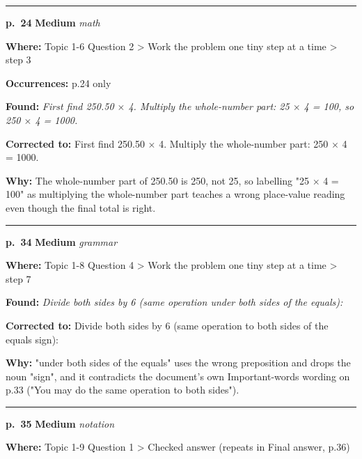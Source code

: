 \documentclass[11pt]{article}
\newcommand{\sevmed}[1]{\textcolor{orange!80!black}{\textbf{#1}}}
\begin{document}
\noindent\rule{\textwidth}{0.4pt}\par\nobreak\vspace{2pt}
\noindent\textbf{p.~24} \quad \sevmed{Medium} \quad \textit{math}\par
\noindent\textbf{Where: }Topic 1-6 Question 2 > Work the problem one tiny step at a time > step 3\par
\noindent\textbf{Occurrences: }p.24 only\par
\noindent\textbf{Found: }\textit{First find 250.50 $\times$ 4. Multiply the whole-number part: 25 $\times$ 4 = 100, so 250 $\times$ 4 = 1000.}\par
\noindent\textbf{Corrected to: }First find 250.50 $\times$ 4. Multiply the whole-number part: 250 $\times$ 4 = 1000.\par
\noindent\textbf{Why: }The whole-number part of 250.50 is 250, not 25, so labelling "25 $\times$ 4 = 100" as multiplying the whole-number part teaches a wrong place-value reading even though the final total is right.\par\vspace{4pt}
\noindent\rule{\textwidth}{0.4pt}\par\nobreak\vspace{2pt}
\noindent\textbf{p.~34} \quad \sevmed{Medium} \quad \textit{grammar}\par
\noindent\textbf{Where: }Topic 1-8 Question 4 > Work the problem one tiny step at a time > step 7\par
\noindent\textbf{Found: }\textit{Divide both sides by 6 (same operation under both sides of the equals):}\par
\noindent\textbf{Corrected to: }Divide both sides by 6 (same operation to both sides of the equals sign):\par
\noindent\textbf{Why: }"under both sides of the equals" uses the wrong preposition and drops the noun "sign", and it contradicts the document's own Important-words wording on p.33 ("You may do the same operation to both sides").\par\vspace{4pt}
\noindent\rule{\textwidth}{0.4pt}\par\nobreak\vspace{2pt}
\noindent\textbf{p.~35} \quad \sevmed{Medium} \quad \textit{notation}\par
\noindent\textbf{Where: }Topic 1-9 Question 1 > Checked answer (repeats in Final answer, p.36)\par
\end{document}
